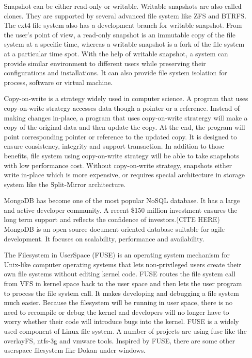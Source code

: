     Snapshot can be either read-only or writable. Writable snapshots are also called clones. They are supported by several advanced file system like ZFS and BTRFS. The ext4 file system also has a development branch for writable snapshot. From the user’s point of view, a read-only snapshot is an immutable copy of the file system at a specific time, whereas a writable snapshot is a fork of the file system at a particular time spot. With the help of writable snapshot, a system can provide similar environment to different users while preserving their configurations and installations. It can also provide file system isolation for process, software or virtual machine.

    Copy-on-write is a strategy widely used in computer science. A program that uses copy-on-write strategy accesses data though a pointer or a reference. Instead of making changes in-place, a program that uses copy-on-write stratergy will make a copy of the original data and then update the copy. At the end, the program will point corresponding pointer or reference to the updated copy. It is designed to ensure consistency, integrity and support transaction. In addition to those benefits, file system using copy-on-write strategy will be able to take snapshots with low performance cost. Without copy-on-write strategy, snapshots either write in-place which is more expensive, or requires special architecture in storage system like the Split-Mirror architecture.

    MongoDB has become one of the most popular NoSQL database. It has a large and active developer community. A recent \$150 million investment ensures the long term support and reflects the confidence of investors.(CITE HERE)\cite{rsync_alg}  MongoDB is an open source document-oriented database suitable for agile development. It focuses on scalability, performance and availability.

    The Filesystem in UserSpace (FUSE) is an operating system mechanism for Unix-like computer operating systems that lets non-privileged users create their own file systems without editing kernel code. FUSE routes the file system call from VFS in kernel space back to the user space and then lets the user program to process the file system call. It makes developing and debugging a file system much easier. Because the filesystem will be running in user space, there is no need to recompile or debug the kernel and developers will no longer have to worry whether their code will introduce bugs into the kernel. FUSE is a widely used component of Linux file system. A number of projects are using fuse like the overlayFS, ntfs-3g and vmware tools. Inspired by FUSE, there are some other userspace filesystem like Dokan under windows.

